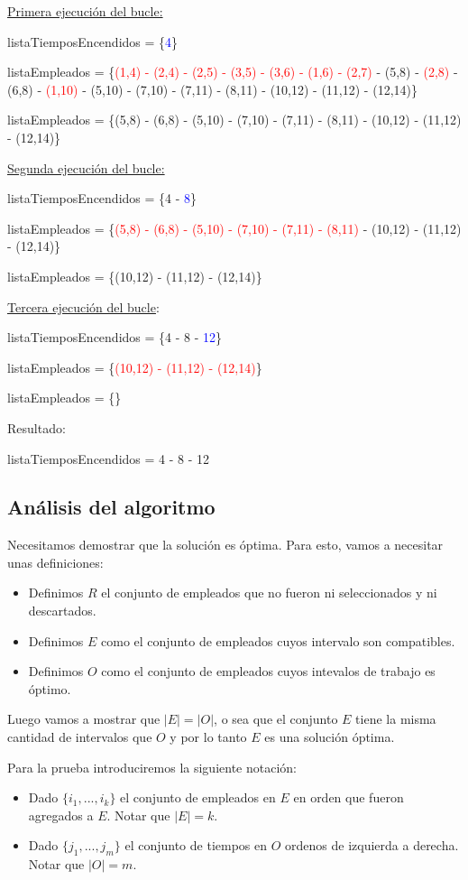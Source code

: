 \documentclass{article}
\begin{document}
\underline{Primera ejecución del bucle:}

listaTiemposEncendidos = \{\textcolor{blue}{4}\}

listaEmpleados = \{\textcolor{red}{(1,4) - (2,4) - (2,5) - (3,5) - (3,6) - (1,6) - (2,7)} - (5,8) - \textcolor{red}{(2,8)} - (6,8) - \textcolor{red}{(1,10)} - (5,10) - (7,10) - (7,11) - (8,11) - (10,12) - (11,12) - (12,14)\}


listaEmpleados = \{(5,8) - (6,8) - (5,10) - (7,10) - (7,11) - (8,11) - (10,12) - (11,12) - (12,14)\}


\underline{Segunda ejecución del bucle:}

listaTiemposEncendidos = \{4 - \textcolor{blue}{8}\}

listaEmpleados = \{\textcolor{red}{(5,8) - (6,8) - (5,10) - (7,10) - (7,11) - (8,11)} - (10,12) - (11,12) - (12,14)\}

listaEmpleados = \{(10,12) - (11,12) - (12,14)\}

\underline{Tercera ejecución del bucle}:

listaTiemposEncendidos = \{4 - 8 - \textcolor{blue}{12}\}

listaEmpleados = \{\textcolor{red}{(10,12) - (11,12) - (12,14)}\}

listaEmpleados = \{\}

Resultado:

listaTiemposEncendidos = {4 - 8 - 12}



\subsection{Análisis del algoritmo}

Necesitamos demostrar que la solución es óptima. Para esto, vamos a necesitar unas definiciones:
\begin{itemize}
    \item Definimos \(R\) el conjunto de empleados que no fueron ni seleccionados y ni descartados.
    \item Definimos \(E\) como el conjunto de empleados cuyos intervalo son compatibles.
    \item Definimos \(O\) como el conjunto de empleados cuyos intevalos de trabajo es óptimo.
\end{itemize}
Luego vamos a mostrar que \(|E| = |O|\), o sea que el conjunto \(E\) tiene la misma cantidad de intervalos que \(O\) y 
por lo tanto \(E\) es una solución óptima.

Para la prueba introduciremos la siguiente notación:
\begin{itemize}
    \item Dado \(\{i_1,...,i_k\}\) el conjunto de empleados en \(E\) en orden que fueron agregados a \(E\). Notar que \(|E|=k\).
    \item Dado \(\{j_1,...,j_m\}\) el conjunto de tiempos en \(O\) ordenos de izquierda a derecha. Notar que \(|O|=m\).
\end{itemize}
\end{document}
